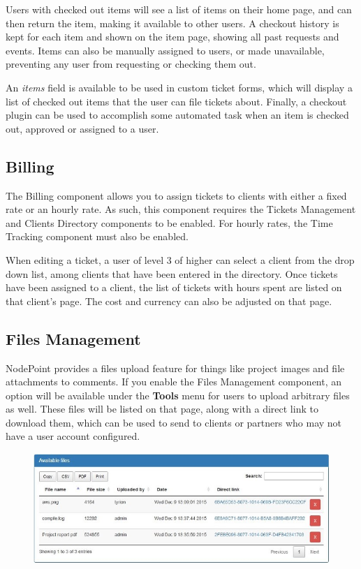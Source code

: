 \documentclass[11pt]{article}
\begin{document}
Users with checked out items will see a list of items on their home page, and can then return the item, making it available to other users. A checkout history is kept for each item and shown on the item page, showing all past requests and events. Items can also be manually assigned to users, or made unavailable, preventing any user from requesting or checking them out.

An \textit{items} field is available to be used in custom ticket forms, which will display a list of checked out items that the user can file tickets about. Finally, a checkout plugin can be used to accomplish some automated task when an item is checked out, approved or assigned to a user.

\subsection{Billing}
The Billing component allows you to assign tickets to clients with either a fixed rate or an hourly rate. As such, this component requires the Tickets Management and Clients Directory components to be enabled. For hourly rates, the Time Tracking component must also be enabled.

When editing a ticket, a user of level 3 of higher can select a client from the drop down list, among clients that have been entered in the directory. Once tickets have been assigned to a client, the list of tickets with hours spent are listed on that client's page. The cost and currency can also be adjusted on that page.

\subsection{Files Management}
NodePoint provides a files upload feature for things like project images and file attachments to comments. If you enable the Files Management component, an option will be available under the \textbf{Tools} menu for users to upload arbitrary files as well. These files will be listed on that page, along with a direct link to download them, which can be used to send to clients or partners who may not have a user account configured.

\begin{figure}[h]
\includegraphics{files.jpg}
\end{figure}
\end{document}
